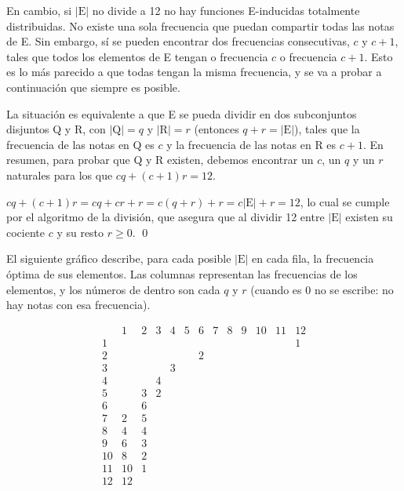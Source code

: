 		En cambio, si $|\text{E}|$ no divide a 12 no hay funciones E-inducidas totalmente distribuidas. No existe una sola frecuencia que puedan compartir todas las notas de E. Sin embargo, sí se pueden encontrar dos frecuencias consecutivas, $c$ y $c+1$, tales que todos los elementos de E tengan o frecuencia $c$ o frecuencia $c+1$. Esto es lo más parecido a que todas tengan la misma frecuencia, y se va a probar a continuación que siempre es posible. 
		
		La situación es equivalente a que E se pueda dividir en dos subconjuntos disjuntos Q y R, con $|\text{Q}|=q$ y $|\text{R}|=r$ (entonces $q+r=|\text{E}|$), tales que la frecuencia de las notas en Q es $c$ y la frecuencia de las notas en R es $c+1$. En resumen, para probar que Q y R existen, debemos encontrar un $c$, un $q$ y un $r$ naturales para los que $cq + (c+1)r=12$.
		
		$cq + (c+1)r =
		cq + cr + r =
		c(q+r) + r =
		c|\text{E}| + r = 12$, lo cual se cumple por el algoritmo de la división, que asegura que al dividir 12 entre $|\text{E}|$ existen su cociente $c$ y su resto $r\geq0$. \qed
		
		El siguiente gráfico describe, para cada posible $|\text{E}|$ en cada fila, la frecuencia óptima de sus elementos. Las columnas representan las frecuencias de los elementos, y los números de dentro son cada $q$ y $r$ (cuando es 0 no se escribe: no hay notas con esa frecuencia).
		
		
%			
%			
%			
	
		\[\begin{array}{l|rrrrrrrrrrrr}
		&1&2&3&4&5&6&7&8&9&10&11&12\\\hline
		1&&&&&&&&&&&&1\\\hline
		2&&&&&&2\\\hline
		3&&&&3\\\hline
		4&&&4\\\hline
		5&&3&2\\\hline
		6&&6\\\hline
		7&2&5\\\hline
		8&4&4\\\hline
		9&6&3\\\hline
		10&8&2\\\hline
		11&10&1\\\hline
		12&12&\\
		\end{array}\]
		
